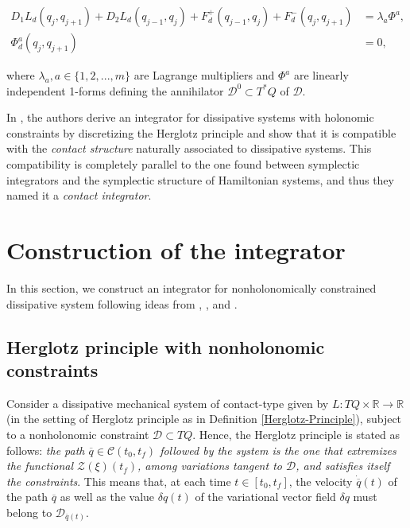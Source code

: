 \documentclass{aims}
\numberwithin{equation}{section}
\theoremstyle{definition}
\begin{document}
\begin{equation}\label{Discrete-Const-Forced-EL}
\begin{split}
    D_1L_d(q_j, q_{j+1})+D_2L_d(q_{j-1}, q_j) + F_d^+(q_{j-1}, q_j)+F_d^-(q_j, q_{j+1})& = \lambda_a \Phi^a, \\
    \Phi_d^a(q_j, q_{j+1}) &= 0,
\end{split}
\end{equation}

\noindent where $\lambda_a, a\in\{1, 2,..., m\}$ are Lagrange multipliers and $\Phi^a$ are linearly independent 1-forms defining the annihilator ${\mathcal D}^0\subset T^*Q$ of ${\mathcal D}$.

In \cite{vermeeren2019contact}, the authors derive an integrator for dissipative systems with holonomic constraints by discretizing the Herglotz principle and show that it is compatible with the {\it contact structure} naturally associated to dissipative systems. This compatibility is completely parallel to the one found between symplectic integrators and the symplectic structure of Hamiltonian systems, and thus they named it a {\it contact integrator}.

\section{Construction of the integrator}\label{sec:Numerical-Scheme}
In this section, we construct an integrator for nonholonomically constrained dissipative system following  ideas from \cite{de2019contact}, \cite{vermeeren2019contact}, and \cite{cortes2001non}.

\subsection{Herglotz principle with nonholonomic constraints} Consider a dissipative mechanical system {of contact-type} given by $L\colon TQ\times \mathbb{R}\to \mathbb{R}$ (in the setting of Herglotz principle as in Definition \ref{Herglotz-Principle}), subject to a nonholonomic constraint ${\mathcal D}\subset TQ$.  
Hence, the Herglotz principle is stated as follows: {\it the path $\overline{q}\in {\mathcal C}(t_0, t_f)$ followed by the system is the one that extremizes the functional ${\mathcal Z}(\xi)(t_f)$, among variations tangent to ${\mathcal D}$, and satisfies itself the constraints}. 
This means that, at each time $t\in [t_0, t_f]$, the velocity $\dot{\overline{q}}(t)$ of the path $\overline{q}$ as well as the value $\delta q(t)$ of the variational vector field $\delta q$ must belong to ${\mathcal D}_{\overline{q}(t)}$. 
\end{document}
